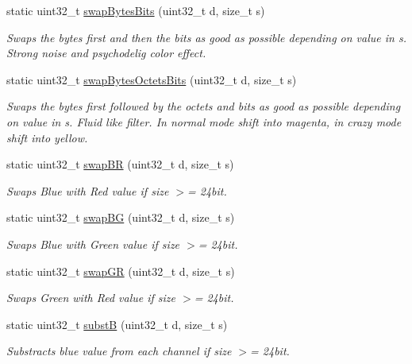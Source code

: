\begin{DoxyCompactItemize}
static uint32\+\_\+t \mbox{\hyperlink{classFilter_a42c3e8f730c64a1bcdf187dc0a09082d}{swap\+Bytes\+Bits}} (uint32\+\_\+t d, size\+\_\+t s)
\begin{DoxyCompactList}\small\item\em Swaps the bytes first and then the bits as good as possible depending on value in s. Strong noise and psychodelig color effect. \end{DoxyCompactList}\item 
static uint32\+\_\+t \mbox{\hyperlink{classFilter_a9c8e2eb790e7e9dff6493a12a1fefc4f}{swap\+Bytes\+Octets\+Bits}} (uint32\+\_\+t d, size\+\_\+t s)
\begin{DoxyCompactList}\small\item\em Swaps the bytes first followed by the octets and bits as good as possible depending on value in s. Fluid like filter. In normal mode shift into magenta, in crazy mode shift into yellow. \end{DoxyCompactList}\item 
static uint32\+\_\+t \mbox{\hyperlink{classFilter_a51a2b1cce4671083d47530694d0e797e}{swap\+BR}} (uint32\+\_\+t d, size\+\_\+t s)
\begin{DoxyCompactList}\small\item\em Swaps Blue with Red value if size $>$= 24bit. \end{DoxyCompactList}\item 
static uint32\+\_\+t \mbox{\hyperlink{classFilter_a68528a62dfbd9f78d6bd0703ca5bd828}{swap\+BG}} (uint32\+\_\+t d, size\+\_\+t s)
\begin{DoxyCompactList}\small\item\em Swaps Blue with Green value if size $>$= 24bit. \end{DoxyCompactList}\item 
static uint32\+\_\+t \mbox{\hyperlink{classFilter_ad6f109289f21be75db0a1351c86d3143}{swap\+GR}} (uint32\+\_\+t d, size\+\_\+t s)
\begin{DoxyCompactList}\small\item\em Swaps Green with Red value if size $>$= 24bit. \end{DoxyCompactList}\item 
static uint32\+\_\+t \mbox{\hyperlink{classFilter_a3f2bbadc0138195cebf84bd8ce8d9892}{substB}} (uint32\+\_\+t d, size\+\_\+t s)
\begin{DoxyCompactList}\small\item\em Substracts blue value from each channel if size $>$= 24bit. \end{DoxyCompactList}\item 

\end{DoxyCompactItemize}
